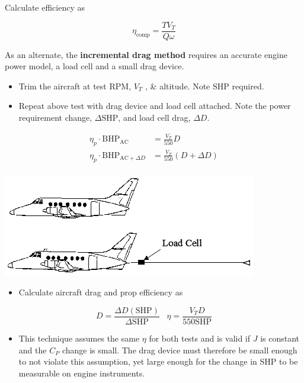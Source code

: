 \documentclass[
]{book}
\providecommand{\tightlist}{%
  \setlength{\itemsep}{0pt}\setlength{\parskip}{0pt}}
\begin{document}
Calculate efficiency as

\[
\eta_{\text{comp}} = \frac{T V_T}{Q \omega}
\]

As an alternate, the \textbf{incremental drag method} requires an accurate engine power model, a load cell and a small drag device.

\begin{itemize}
\tightlist
\item
  Trim the aircraft at test \(\text{RPM}\), \(V_T\) , \& altitude. Note \(\mathrm{SHP}\) required.
\item
  Repeat above test with drag device and load cell attached. Note the power requirement change, \(\Delta \mathrm{SHP}\), and load cell drag, \(\Delta D\).
\end{itemize}

\[
\begin{align}
\eta_p \cdot \mathrm{BHP}_{\mathrm{AC}} &= \frac{V_T}{550}D \\
\eta_p \cdot \mathrm{BHP}_{\mathrm{AC} + \Delta D} &= \frac{V_T}{550} \left(D + \Delta D \right) \\
\end{align}
\]

\includegraphics[width=4.37431in,height=1.75in]{media/11/image34.png}

\begin{itemize}
\tightlist
\item
  Calculate aircraft drag and prop efficiency as
\end{itemize}

\[
D = \frac{\Delta D \left( \mathrm{SHP} \right)}{\Delta  \mathrm{SHP} } \;\;\; \eta = \frac{V_T D}{550 \mathrm{SHP}} 
\]

\begin{itemize}
\tightlist
\item
  This technique assumes the same \(\eta\) for both tests and is valid if \(J\) is constant and the \(C_P\) change is small. The drag device must therefore be small enough to not violate this assumption, yet large enough for the change in \(\mathrm{SHP}\) to be measurable on engine instruments.
\end{itemize}
\end{document}

